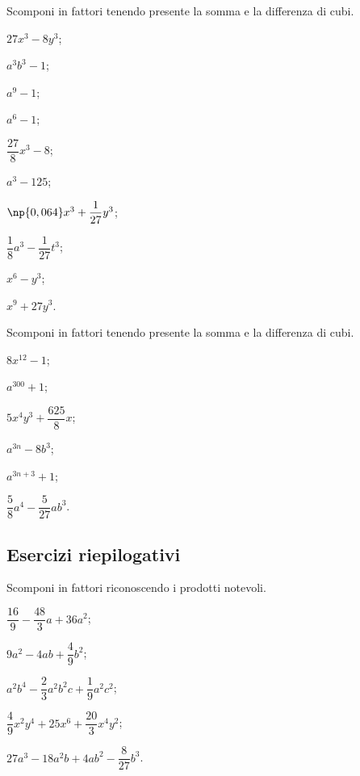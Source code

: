 \begin{esercizio}
\label{ese:13.73}
 Scomponi in fattori tenendo presente la somma e la differenza di cubi.
 \begin{multicols}{3}
 \begin{enumeratea}
  \item $27x^{3}-8y^{3}$;
 \item $a^{3}b^{3}-1$;
 \item $a^{9}-1$;
 \item $a^{6}-1$;
 \item $\dfrac{27}{8}x^{3}-8$;
 \item $a^{3}-125$;
 \item $\np{0,064}x^{3}+\dfrac{1}{27}y^{3}$;
 \item $\dfrac{1}{8}a^{3}-\dfrac{1}{27}t^{3}$;
 \item $x^{6}-y^{3}$;
 \item $x^{9}+27y^{3}$.
 \end{enumeratea}
 \end{multicols}
\end{esercizio}

\begin{esercizio}
\label{ese:13.74}
 Scomponi in fattori tenendo presente la somma e la differenza di cubi.
 \begin{multicols}{3}
 \begin{enumeratea}
 \item $8x^{12}-1$;
 \item $a^{300}+1$;
\item $5x^{4}y^{3}+\dfrac{625}{8}x$;
 \item $a^{3n}-8b^{3}$;
 \item $a^{3n+3}+1$;
 \item $\dfrac{5}{8}a^{4}-\dfrac{5}{27}ab^{3}$.
 \end{enumeratea}
 \end{multicols}
\end{esercizio}

\subsection{Esercizi riepilogativi}

\begin{esercizio}[\Ast]
\label{ese:13.75}
Scomponi in fattori riconoscendo i prodotti notevoli.
\begin{enumeratea}
 \item $\dfrac{16}{9}-\dfrac{48}{3}a+36a^{2}$;
 \item $9a^{2}-4ab+\dfrac{4}{9}b^{2}$;
 \item $a^{2}b^{4}-\dfrac{2}{3}a^{2}b^{2}c+\dfrac{1}{9}a^{2}c^{2}$;
 \item $\dfrac{4}{9}x^{2}y^{4}+25x^{6}+\dfrac{20}{3}x^{4}y^{2}$;
 \item $27a^{3}-18a^{2}b+4ab^{2}-\dfrac{8}{27}b^{3}$.
\end{enumeratea}
\end{esercizio}

